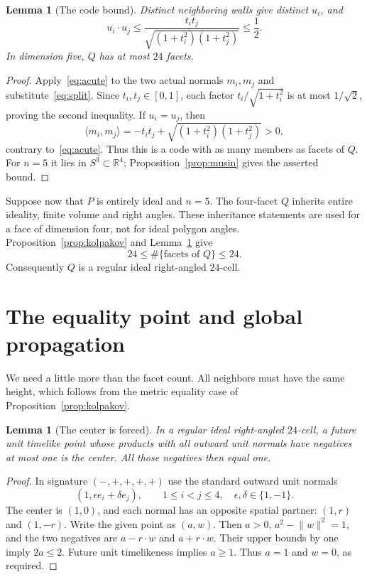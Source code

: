 \documentclass[11pt]{article}
\newtheorem{lemma}[theorem]{Lemma}
\theoremstyle{remark}
\newcommand{\RR}{\mathbb R}
\newcommand{\ip}[2]{\langle #1,#2\rangle}
\newcommand{\norm}[1]{\lVert #1\rVert}
\begin{document}
\begin{lemma}[The code bound]\label{lem:code}
Distinct neighboring walls give distinct $u_i$, and
\begin{equation}\label{eq:code}
 u_i\cdot u_j\le
 \frac{t_it_j}{\sqrt{(1+t_i^2)(1+t_j^2)}}\le\frac12.
\end{equation}
In dimension five, $Q$ has at most $24$ facets.
\end{lemma}
\begin{proof}
Apply~\eqref{eq:acute} to the two actual normals $m_i,m_j$ and
substitute~\eqref{eq:split}. Since $t_i,t_j\in[0,1]$, each factor
$t_i/\sqrt{1+t_i^2}$ is at most $1/\sqrt2$, proving the second
inequality. If $u_i=u_j$, then
\[
 \ip{m_i}{m_j}
 =-t_it_j+\sqrt{(1+t_i^2)(1+t_j^2)}>0,
\]
contrary to~\eqref{eq:acute}. Thus this is a code with as many
members as facets of $Q$. For $n=5$ it lies in $S^3\subset\RR^4$;
Proposition~\ref{prop:musin} gives the asserted bound.
\end{proof}

Suppose now that $P$ is entirely ideal and $n=5$. The four-facet $Q$
inherits entire ideality, finite volume and right angles. These
inheritance statements are used for a face of dimension four, not
for ideal polygon angles. Proposition~\ref{prop:kolpakov} and
Lemma~\ref{lem:code} give
\begin{equation}\label{eq:equality}
 24\le \#\{\text{facets of }Q\}\le24.
\end{equation}
Consequently $Q$ is a regular ideal right-angled $24$-cell.

\section{The equality point and global propagation}

We need a little more than the facet count. All neighbors must have
the same height, which follows from the metric equality case of
Proposition~\ref{prop:kolpakov}.

\begin{lemma}[The center is forced]\label{lem:center}
In a regular ideal right-angled $24$-cell, a future unit timelike point
whose products with all outward unit normals have negatives at most
one is the center. All those negatives then equal one.
\end{lemma}
\begin{proof}
In signature $(-,+,+,+,+)$ use the standard outward unit normals
\begin{equation}\label{eq:cellnormals}
 (1,\epsilon e_i+\delta e_j),\qquad
 1\le i<j\le4,\quad\epsilon,\delta\in\{1,-1\}.
\end{equation}
The center is $(1,0)$, and each normal has an opposite spatial
partner: $(1,r)$ and $(1,-r)$. Write the given point as $(a,w)$.
Then $a>0$, $a^2-\norm w^2=1$, and the two negatives are
$a-r\cdot w$ and $a+r\cdot w$. Their upper bounds by one imply
$2a\le2$. Future unit timelikeness implies $a\ge1$. Thus $a=1$
and $w=0$, as required.
\end{proof}
\end{document}
